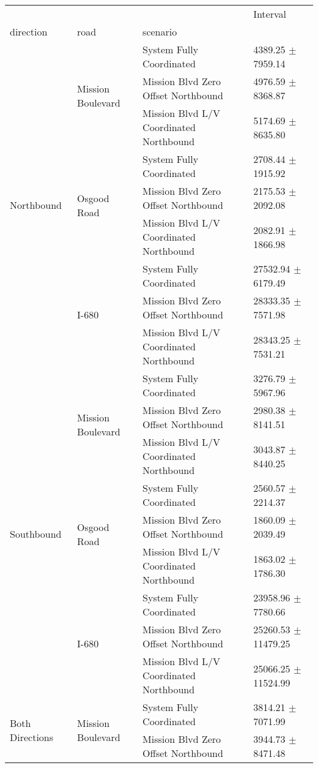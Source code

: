 \begin{tabular}{llll}
\toprule
 &  &  & Interval \\
direction & road & scenario &  \\
\midrule
\multirow[t]{9}{*}{Northbound} & \multirow[t]{3}{*}{Mission Boulevard} & System Fully Coordinated & 4389.25 $\pm$ 7959.14 \\
 &  & Mission Blvd Zero Offset Northbound & 4976.59 $\pm$ 8368.87 \\
 &  & Mission Blvd L/V Coordinated Northbound & 5174.69 $\pm$ 8635.80 \\
 & \multirow[t]{3}{*}{Osgood Road} & System Fully Coordinated & 2708.44 $\pm$ 1915.92 \\
 &  & Mission Blvd Zero Offset Northbound & 2175.53 $\pm$ 2092.08 \\
 &  & Mission Blvd L/V Coordinated Northbound & 2082.91 $\pm$ 1866.98 \\
 & \multirow[t]{3}{*}{I-680} & System Fully Coordinated & 27532.94 $\pm$ 6179.49 \\
 &  & Mission Blvd Zero Offset Northbound & 28333.35 $\pm$ 7571.98 \\
 &  & Mission Blvd L/V Coordinated Northbound & 28343.25 $\pm$ 7531.21 \\
\multirow[t]{9}{*}{Southbound} & \multirow[t]{3}{*}{Mission Boulevard} & System Fully Coordinated & 3276.79 $\pm$ 5967.96 \\
 &  & Mission Blvd Zero Offset Northbound & 2980.38 $\pm$ 8141.51 \\
 &  & Mission Blvd L/V Coordinated Northbound & 3043.87 $\pm$ 8440.25 \\
 & \multirow[t]{3}{*}{Osgood Road} & System Fully Coordinated & 2560.57 $\pm$ 2214.37 \\
 &  & Mission Blvd Zero Offset Northbound & 1860.09 $\pm$ 2039.49 \\
 &  & Mission Blvd L/V Coordinated Northbound & 1863.02 $\pm$ 1786.30 \\
 & \multirow[t]{3}{*}{I-680} & System Fully Coordinated & 23958.96 $\pm$ 7780.66 \\
 &  & Mission Blvd Zero Offset Northbound & 25260.53 $\pm$ 11479.25 \\
 &  & Mission Blvd L/V Coordinated Northbound & 25066.25 $\pm$ 11524.99 \\
\multirow[t]{9}{*}{Both Directions} & \multirow[t]{3}{*}{Mission Boulevard} & System Fully Coordinated & 3814.21 $\pm$ 7071.99 \\
 &  & Mission Blvd Zero Offset Northbound & 3944.73 $\pm$ 8471.48 \\

\end{tabular}
